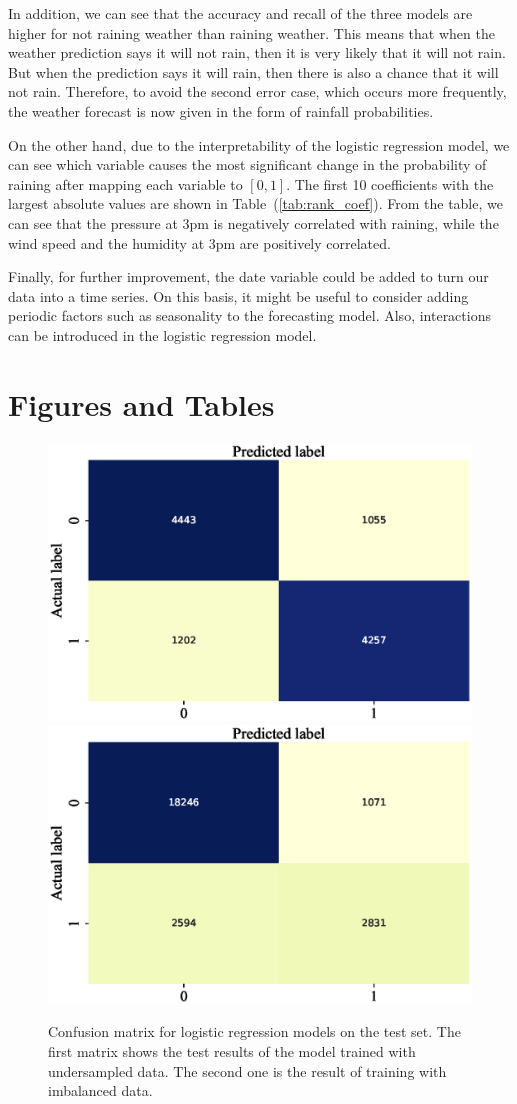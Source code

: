 \documentclass[11pt, a4paper, jou]{apa7}
\begin{document}
In addition, we can see that the accuracy and recall of the three models are higher for not raining weather than raining weather. This means that when the weather prediction says it will not rain, then it is very likely that it will not rain. But when the prediction says it will rain, then there is also a chance that it will not rain. Therefore, to avoid the second error case, which occurs more frequently, the weather forecast is now given in the form of rainfall probabilities. 

On the other hand, due to the interpretability of the logistic regression model, we can see which variable causes the most significant change in the probability of raining after mapping each variable to $[0,1]$. The first 10 coefficients with the largest absolute values are shown in Table~(\ref{tab:rank_coef}). From the table, we can see that the pressure at 3pm is negatively correlated with raining, while the wind speed and the humidity at 3pm are positively correlated. 

Finally, for further improvement, the date variable could be added to turn our data into a time series. On this basis, it might be useful to consider adding periodic factors such as seasonality to the forecasting model. Also, interactions can be introduced in the logistic regression model. 

\printbibliography 
\clearpage
\appendix
\section{Figures and Tables}

\begin{figure}[p]
    \centering
    \caption{Confusion matrix for logistic regression models on the test set. The first matrix shows the test results of the model trained with undersampled data. The second one is the result of training with imbalanced data. }\label{fig:log_cm}
    \includegraphics[width=.45\textwidth]{figures/log_cm.eps}
    \includegraphics[width=.45\textwidth]{figures/Logit_confusion_matrix_without_undersampling.eps}
\end{figure}
\end{document}
